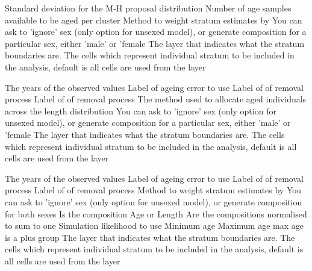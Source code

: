  {}
 {Standard deviation for the M-H proposal distribution}
 {Number of age samples available to be aged per cluster}
 {Method to weight stratum estimates by}
 {You can ask to 'ignore' sex (only option for unsexed model), or generate composition for a particular sex, either 'male' or 'female}
 {The layer that indicates what the stratum boundaries are.}
 {The cells which represent individual stratum to be included in the analysis, default is all cells are used from the layer}
\par\textbf{}\par
{} {The years of the observed values}
 {Label of ageing error to use}
 {Label of of removal process}
 {Label of of removal process}
 {The method used to allocate aged individuals across the length distribution}
 {You can ask to 'ignore' sex (only option for unsexed model), or generate composition for a particular sex, either 'male' or 'female}
 {The layer that indicates what the stratum boundaries are.}
 {The cells which represent individual stratum to be included in the analysis, default is all cells are used from the layer}
\par\textbf{}\par
{} {The years of the observed values}
 {Label of ageing error to use}
 {Label of of removal process}
 {Label of of removal process}
 {Method to weight stratum estimates by}
 {You can ask to 'ignore' sex (only option for unsexed model), or generate composition for both sexes}
 {Is the composition Age or Length}
 {Are the compositions normalised to sum to one}
 {Simulation likelihood to use}
 {Minimum age}
 {Maximum age}
 {max age is a plus group}
 {The layer that indicates what the stratum boundaries are.}
 {The cells which represent individual stratum to be included in the analysis, default is all cells are used from the layer}
